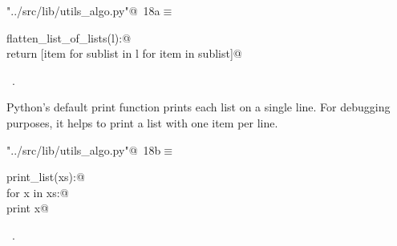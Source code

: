 \documentclass[11.5pt]{report}
\begin{document}
\begin{flushleft} \small
\begin{minipage}{\linewidth}\label{scrap14}\raggedright\small
{} \verb@"../src/lib/utils_algo.py"@\nobreak\ {\footnotesize {18a}}$\equiv$
\vspace{-1ex}
\begin{list}{}{} \item
\mbox{}\verb@def flatten_list_of_lists(l):@\\
\mbox{}\verb@       return [item for sublist in l for item in sublist]@\\
\mbox{}\verb@@{\NWsep}
\end{list}
\vspace{-1.5ex}
\footnotesize
\begin{list}{}{\setlength{\itemsep}{-\parsep}\setlength{\itemindent}{-\leftmargin}}
\item \NWtxtFileDefBy\ .

\item{}
\end{list}
\end{minipage}\vspace{4ex}
\end{flushleft}

\vspace{-0.8cm}
\newchunk Python's default print function prints each list on a single line. For 
debugging purposes,  it helps to print a list with one item per line. 

\begin{flushleft} \small\label{scrap15}\raggedright\small
{} \verb@"../src/lib/utils_algo.py"@\nobreak\ {\footnotesize {18b}}$\equiv$
\vspace{-1ex}
\begin{list}{}{} \item
\mbox{}\verb@def print_list(xs):@\\
\mbox{}\verb@    for x in xs:@\\
\mbox{}\verb@        print x@\\
\mbox{}\verb@@{\NWsep}
\end{list}
\vspace{-1.5ex}
\footnotesize
\begin{list}{}{\setlength{\itemsep}{-\parsep}\setlength{\itemindent}{-\leftmargin}}
\item \NWtxtFileDefBy\ .

\item{}
\end{list}
\vspace{4ex}
\end{flushleft}
\end{document}
